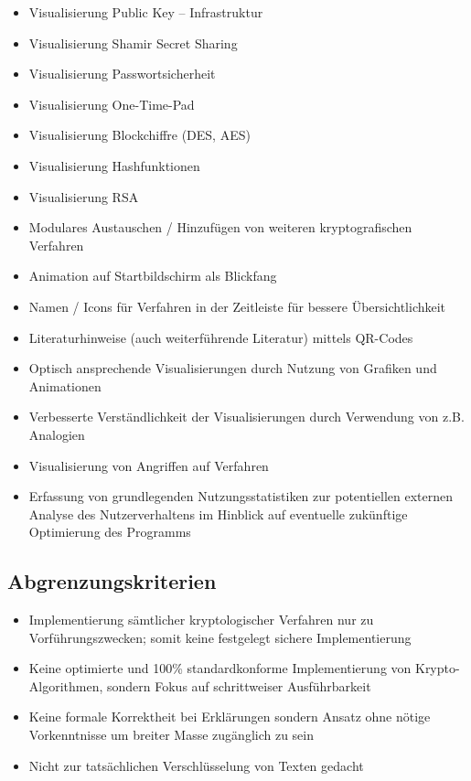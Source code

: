 \documentclass{article}
\begin{document}
\begin{itemize}
    \item Visualisierung Public Key – Infrastruktur
    \item Visualisierung Shamir Secret Sharing
    \item Visualisierung Passwortsicherheit
    \item Visualisierung One-Time-Pad
    \item Visualisierung Blockchiffre (DES, AES)
    \item Visualisierung Hashfunktionen
    \item Visualisierung RSA
    \item Modulares Austauschen / Hinzufügen von weiteren kryptografischen Verfahren
    \item Animation auf Startbildschirm als Blickfang
    \item Namen / Icons für Verfahren in der Zeitleiste für bessere Übersichtlichkeit
    \item Literaturhinweise (auch weiterführende Literatur) mittels QR-Codes
    \item Optisch ansprechende Visualisierungen durch Nutzung von Grafiken und Animationen
    \item Verbesserte Verständlichkeit der Visualisierungen durch Verwendung von z.B. Analogien
    \item Visualisierung von Angriffen auf Verfahren
    \item Erfassung von grundlegenden Nutzungsstatistiken zur potentiellen externen Analyse des Nutzerverhaltens  im Hinblick auf eventuelle zukünftige Optimierung des Programms
\end{itemize}

\subsection{Abgrenzungskriterien}
\begin{itemize}
	\item Implementierung sämtlicher kryptologischer Verfahren nur zu Vorführungszwecken; somit keine festgelegt sichere Implementierung
    \item Keine optimierte und 100\% standardkonforme Implementierung von Krypto-Algorithmen,
        sondern Fokus auf schrittweiser Ausführbarkeit
    \item Keine formale Korrektheit bei Erklärungen sondern Ansatz ohne nötige Vorkenntnisse
        um breiter Masse zugänglich zu sein
    \item Nicht zur tatsächlichen Verschlüsselung von Texten gedacht
\end{itemize}
\end{document}
